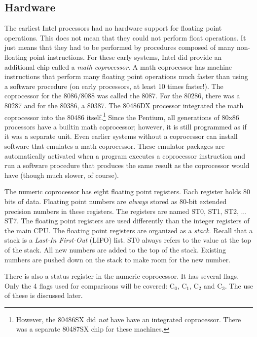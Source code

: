 {\subsection{Hardware}
The earliest Intel processors had no hardware support for floating
point operations. This does not mean that they could not perform float
operations.  It just means that they had to be performed by procedures
composed of many non-floating point instructions. For these early
systems, Intel did provide an additional chip called a \emph{math
coprocessor}. A math coprocessor has machine instructions that perform
many floating point operations much faster than using a software
procedure (on early processors, at least 10 times faster!). The
coprocessor for the 8086/8088 was called the 8087. For the 80286,
there was a 80287 and for the 80386, a 80387. The 80486DX processor
integrated the math coprocessor into the 80486
itself.\footnote{However, the 80486SX did \emph{not} have have an
integrated coprocessor.  There was a separate 80487SX chip for these
machines.}  Since the Pentium, all generations of 80x86 processors
have a builtin math coprocessor; however, it is still programmed as if
it was a separate unit. Even earlier systems without a coprocessor can
install software that emulates a math coprocessor. These emulator
packages are automatically activated when a program executes a
coprocessor instruction and run a software procedure that produces the
same result as the coprocessor would have (though much slower, of
course).

The numeric coprocessor has eight floating point registers. Each
register holds 80 bits of data. Floating point numbers are
\emph{always} stored as 80-bit extended precision numbers in these
registers. The registers are named {\code ST0}, {\code ST1}, {\code
ST2}, $\ldots$ {\code ST7}.  The floating point registers are used
differently than the integer registers of the main CPU. The floating
point registers are organized as a \emph{stack}.  Recall that a stack
is a \emph{Last-In First-Out} (LIFO) list. {\code ST0} always refers
to the value at the top of the stack. All new numbers are added to the
top of the stack. Existing numbers are pushed down on the stack to
make room for the new number.

There is also a status register in the numeric coprocessor. It has several
flags. Only the 4 flags used for comparisons will be covered: C$_0$,
C$_1$, C$_2$ and C$_3$. The use of these is discussed later.

}
